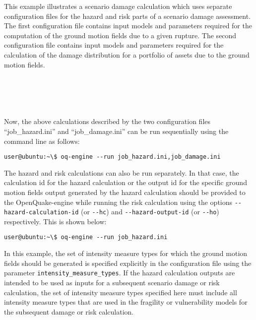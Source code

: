 This example illustrates a scenario damage calculation which uses separate
configuration files for the hazard and risk parts of a scenario damage
assessment. The first configuration file contains input models and parameters
required for the computation of the ground motion fields due to a given
rupture. The second configuration file contains input models and parameters
required for the calculation of the damage distribution for a portfolio of
assets due to the ground motion fields.

\inputminted[firstline=1,firstnumber=1,fontsize=\footnotesize,frame=single,linenos,bgcolor=lightgray,label=job\_hazard.ini]{ini}{oqum/risk/verbatim/config_scenario_hazard.ini}\\

\inputminted[firstline=1,firstnumber=1,fontsize=\footnotesize,frame=single,linenos,bgcolor=lightgray,label=job\_damage.ini]{ini}{oqum/risk/verbatim/config_scenario_damage_minimal.ini}\\

Now, the above calculations described by the two configuration files
``job\_hazard.ini'' and ``job\_damage.ini'' can be run sequentially using the
command line as follows:

\begin{Verbatim}[frame=single, commandchars=\\\{\}, samepage=true]
user@ubuntu:~\$ oq-engine --run job_hazard.ini,job_damage.ini
\end{Verbatim}

The hazard and risk calculations can also be run separately. In that case, the
calculation id for the hazard calculation or the output id for the specific
ground motion fields output generated by the hazard calculation should be
provided to the OpenQuake-engine while running the risk calculation using the
options \Verb+--hazard-calculation-id+ (or \Verb+--hc+) and 
\Verb+--hazard-output-id+ (or \Verb+--ho+) respectively. This is shown below:

\begin{Verbatim}[frame=single, commandchars=\\\{\}, samepage=true]
user@ubuntu:~\$ oq-engine --run job_hazard.ini
\end{Verbatim}

In this example, the set of intensity measure types for which the ground
motion fields should be generated is specified explicitly in the configuration
file using the parameter \Verb+intensity_measure_types+. If the hazard
calculation outputs are intended to be used as inputs for a subsequent
scenario damage or risk calculation, the set of intensity measure types
specified here must include all intensity measure types that are used in the
fragility or vulnerability models for the subsequent damage or risk
calculation.

